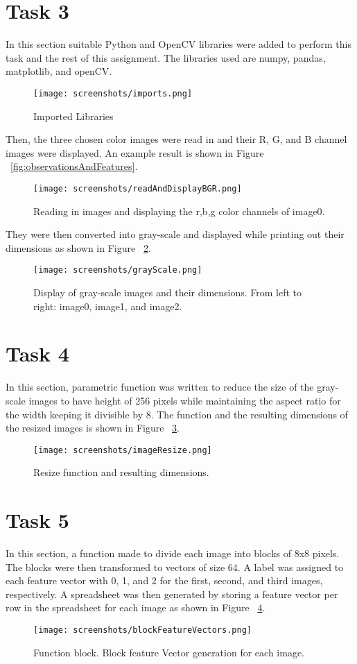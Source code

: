 \documentclass[sigconf]{acmart}
\begin{document}
\section{Task 3}
In this section suitable Python and OpenCV libraries were added to perform this task and the rest of this assignment. The libraries used are numpy, pandas, matplotlib, and openCV.

\begin{figure}[h]
  \centering
  \texttt{[image: screenshots/imports.png]}
  \caption{Imported Libraries}
  \label{fig:importedLibraries}
\end{figure}

Then, the three chosen color images were read in and their R, G, and B channel images were displayed. An example result is shown in Figure ~\ref{fig:observationsAndFeatures}.
\begin{figure}[h]
  \centering
  \texttt{[image: screenshots/readAndDisplayBGR.png]}
  \caption{Reading in images and displaying the r,b,g color channels of image0.}
\end{figure}

They were then converted into gray-scale and displayed while printing out their dimensions as shown in Figure ~\ref{fig:grayscale}.
\begin{figure}[h]
  \centering
  \texttt{[image: screenshots/grayScale.png]}
  \caption{Display of gray-scale images and their dimensions. From left to right: image0, image1, and image2. }
  \label{fig:grayscale}
\end{figure}

\section{Task 4}
In this section, parametric function was written to reduce the size of the gray-scale images to have height of 256 pixels while maintaining the aspect ratio for the width keeping it divisible by 8. The function and the resulting dimensions of the resized images is shown in Figure ~\ref{fig:resize}.
\begin{figure}[h]
  \centering
  \texttt{[image: screenshots/imageResize.png]}
  \caption{Resize function and resulting dimensions.}
  \label{fig:resize}
\end{figure}

\section{Task 5}
In this section, a function made to divide each image into blocks of 8x8 pixels. The blocks were then transformed to vectors of size 64. A label was assigned to each feature vector with 0, 1, and 2 for the first, second, and third images, respectively. A spreadsheet was then generated by storing a feature vector per row in the spreadsheet for each image as shown in Figure ~\ref{fig:block}.
\begin{figure}[h]
  \centering
  \texttt{[image: screenshots/blockFeatureVectors.png]}
  \caption{Function block. Block feature Vector generation for each image.}
  \label{fig:block}
\end{figure}
\end{document}
